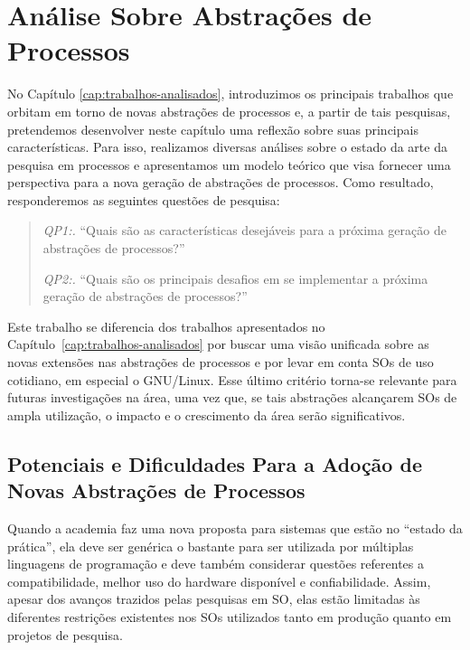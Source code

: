 \chapter{Análise Sobre Abstrações de Processos}
\label{cap:analise-sobre-abstracoes-de-processos}

No Capítulo \ref{cap:trabalhos-analisados}, introduzimos os principais trabalhos
que orbitam em torno de novas abstrações de processos e, a partir de tais
pesquisas, pretendemos desenvolver neste capítulo uma reflexão sobre suas principais
características. Para isso, realizamos diversas análises sobre o estado da arte
da pesquisa em processos e apresentamos um modelo teórico que visa fornecer
uma perspectiva para a nova geração de abstrações de processos. Como resultado,
responderemos as seguintes questões de pesquisa:

\begin{quote}
 \item \textit{QP1:.} ``Quais são as características desejáveis para a próxima geração de abstrações de processos?''
 \item \textit{QP2:.} ``Quais são os principais desafios em se implementar a próxima geração de abstrações de processos?''
\end{quote}

Este trabalho se diferencia dos trabalhos apresentados no
Capítulo~\ref{cap:trabalhos-analisados} por buscar uma visão unificada sobre as
novas extensões nas abstrações de processos e por levar em conta SOs de uso
cotidiano, em especial o GNU/Linux. Esse último critério torna-se relevante
para futuras investigações na área, uma vez que, se tais abstrações alcançarem
SOs de ampla utilização, o impacto e o crescimento da área serão significativos.

\section{Potenciais e Dificuldades Para a Adoção de Novas Abstrações de Processos}
\label{sec:potenciais}
Quando a academia faz uma nova proposta para sistemas que estão no ``estado da
prática'', ela deve ser genérica o bastante para ser utilizada por
múltiplas linguagens de programação e deve também considerar questões
referentes a compatibilidade, melhor uso do hardware disponível e
confiabilidade. Assim, apesar dos avanços trazidos pelas pesquisas em SO, elas
estão limitadas às diferentes restrições existentes nos SOs utilizados tanto em
produção quanto em projetos de pesquisa.

